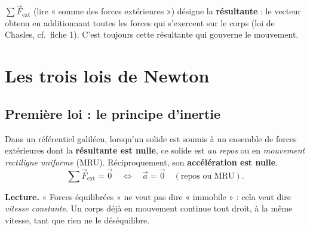 \documentclass[11pt,a4paper]{article}
\newcommand{\vv}[1]{\vec{#1}}
\begin{document}
\begin{remarque}
$\sum\vv F_{\text{ext}}$ (lire « somme des forces extérieures ») désigne la \textbf{résultante} :
le vecteur obtenu en additionnant toutes les forces qui s'exercent sur le corps (loi de Chasles,
cf.\ fiche 1). C'est toujours cette résultante qui gouverne le mouvement.
\end{remarque}

\section{Les trois lois de Newton}

\subsection{Première loi : le principe d'inertie}

\begin{theoreme}
Dans un référentiel galiléen, lorsqu'un solide est soumis à un ensemble de forces extérieures
dont la \textbf{résultante est nulle}, ce solide est \emph{au repos} ou en \emph{mouvement rectiligne
uniforme} (MRU). Réciproquement, son \textbf{accélération est nulle}.
\[ \sum \vv F_{\text{ext}} = \vv 0 \quad\Longleftrightarrow\quad \vv a = \vv 0
   \quad(\text{repos ou MRU}). \]
\end{theoreme}

\noindent\textbf{Lecture.} « Forces équilibrées » ne veut pas dire « immobile » : cela veut dire
\emph{vitesse constante}. Un corps déjà en mouvement continue tout droit, à la même vitesse, tant
que rien ne le déséquilibre.

\begin{center}
\end{center}
\end{document}
